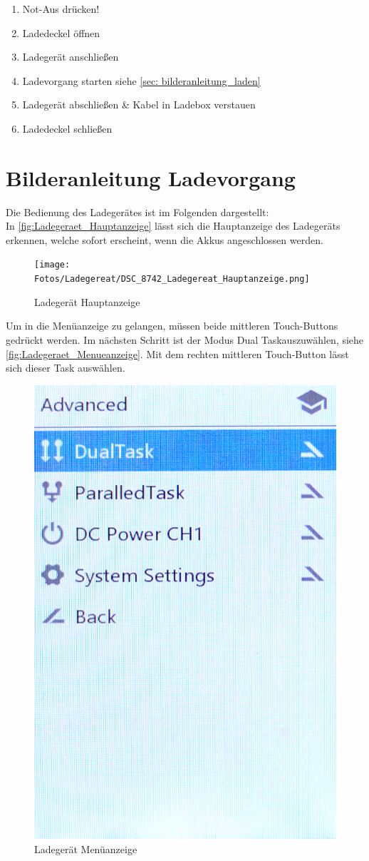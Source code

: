 \begin{enumerate}
    \item Not-Aus drücken!
    \item Ladedeckel öffnen
    \item Ladegerät anschließen
    \item Ladevorgang starten siehe \ref{sec: bilderanleitung_laden}
    \item Ladegerät abschließen \& Kabel in Ladebox verstauen
    \item Ladedeckel schließen
\end{enumerate}

\newpage
\section{Bilderanleitung Ladevorgang \label{sec: bilderanleitung_laden}}
Die Bedienung des Ladegerätes ist im Folgenden dargestellt: \\

In \autoref{fig:Ladegeraet_Hauptanzeige} lässt sich die Hauptanzeige des Ladegeräts erkennen, welche 
sofort erscheint, wenn die Akkus angeschlossen werden. 

\begin{figure}[H]
    \centering
    \texttt{[image: Fotos/Ladegereat/DSC\_8742\_Ladegereat\_Hauptanzeige.png]}
    \caption{Ladegerät Hauptanzeige \label{fig:Ladegeraet_Hauptanzeige}}
\end{figure}

Um in die Menüanzeige zu gelangen, müssen beide mittleren Touch-Buttons gedrückt werden.
Im nächsten Schritt ist der Modus \glqq Dual Task\grqq auszuwählen, siehe \autoref{fig:Ladegeraet_Menueanzeige}. Mit dem rechten mittleren Touch-Button lässt sich 
dieser Task auswählen. 
\begin{figure}[H]
    \centering
    \includegraphics[width=.3\textwidth]{Fotos/Ladegereat/DSC_8744_Lademenue.png}
    \caption{Ladegerät Menüanzeige \label{fig:Ladegeraet_Menueanzeige}}
\end{figure}

